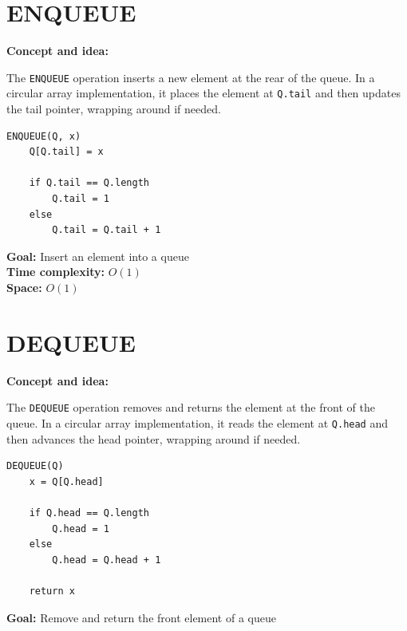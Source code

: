 \documentclass[11pt,a4paper,openany]{book}
\begin{document}
\vspace{2cm}






\section{ENQUEUE}
\textbf{Concept and idea:}

The \texttt{ENQUEUE} operation inserts a new element at the rear of the queue.  
In a circular array implementation, it places the element at \texttt{Q.tail} and then updates the tail pointer, wrapping around if needed.

\begin{lstlisting}
ENQUEUE(Q, x)
    Q[Q.tail] = x

    if Q.tail == Q.length
        Q.tail = 1
    else
        Q.tail = Q.tail + 1
\end{lstlisting}

\textbf{Goal:} Insert an element into a queue \\

\textbf{Time complexity:} $O(1)$ \\

\textbf{Space:} $O(1)$











\vspace{2cm}






\section{DEQUEUE}
\textbf{Concept and idea:}

The \texttt{DEQUEUE} operation removes and returns the element at the front of the queue.  
In a circular array implementation, it reads the element at \texttt{Q.head} and then advances the head pointer, wrapping around if needed.

\begin{lstlisting}
DEQUEUE(Q)
    x = Q[Q.head]

    if Q.head == Q.length
        Q.head = 1
    else
        Q.head = Q.head + 1

    return x
\end{lstlisting}

\textbf{Goal:} Remove and return the front element of a queue \\
\end{document}
